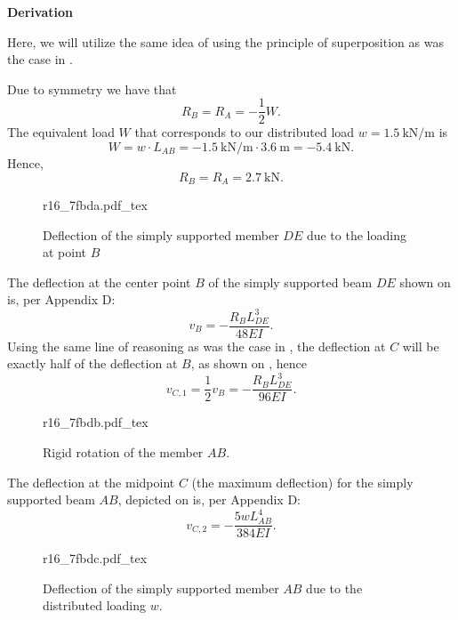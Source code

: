 \documentclass[a4paper]{article}
\newcommand{\incfig}[2][1]{%
  \def\svgwidth{#1\columnwidth}
  {#2.pdf_tex}
}
\numberwithin{equation}{problem}
\newcommand{\AUheading}[1]{%
  \par\vspace{.4\baselineskip}%
  {\sffamily\bfseries\color{AUblueDark}#1\par}%
  \nobreak%
}
\newenvironment{derivation}[1][Derivation]{%
  \AUheading{#1}
  \begingroup\allowdisplaybreaks
  \setlength{\abovedisplayskip}{6pt}%
  \setlength{\belowdisplayskip}{6pt}%
  \setlength{\abovedisplayshortskip}{4pt}%
  \setlength{\belowdisplayshortskip}{4pt}%
}{\par\endgroup\medskip}
\begin{document}
\begin{derivation}
  Here, we will utilize the same idea of using the principle of superposition as was the case in .

  Due to symmetry we have that
  \begin{equation*}
    R_B = R_A = - \frac{1}{2} W
  .\end{equation*}
  The equivalent load $W$ that corresponds to our distributed load $w = \qty{1,5}{\kN\per\m}$ is
  \begin{equation*}
    W = w \cdot L_{AB} = \qty{-1,5}{\kN\per\m} \cdot \qty{3,6}{\m} = \qty{-5,4}{\kN} 
  .\end{equation*}
  Hence,
  \begin{equation*}
    R_B = R_A = \qty{2,7}{\kN}
  .\end{equation*}
  
\begin{figure}[ht]
    \centering
    \incfig{r16_7fbda}
    \caption{Deflection of the simply supported member $DE$ due to the loading at point $B$}
    \label{fig:r16_7fbda}
\end{figure}

  The deflection at the center point $B$ of the simply supported beam $DE$ shown on  is, per Appendix D:
  \begin{equation*}
    v_{B} = - \frac{R_BL_{DE}^3}{48 EI}
  .\end{equation*}
  Using the same line of reasoning as was the case in , the deflection at $C$ will be exactly half of the deflection at $B$, as shown on , hence
  \begin{equation*}
    v_{C,1} = \frac{1}{2} v_B = - \frac{R_B L_{DE}^3}{96 EI}
  .\end{equation*}

\begin{figure}[ht]
    \centering
    \incfig{r16_7fbdb}
    \caption{Rigid rotation of the member $AB$.}
    \label{fig:r16_7fbdb}
\end{figure}
  
  The deflection at the midpoint $C$ (the maximum deflection) for the simply supported beam $AB$, depicted on  is, per Appendix D:
  \begin{equation*}
    v_{C,2} = - \frac{5 w L_{AB}^{4}}{384 EI}
  .\end{equation*}

\begin{figure}[ht]
    \centering
    \incfig{r16_7fbdc}
    \caption{Deflection of the simply supported member $AB$ due to the distributed loading $w$.}
    \label{fig:r16_7fbdc}
\end{figure}


\end{derivation}
\end{document}
